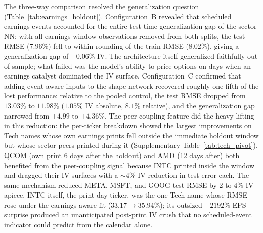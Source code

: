 \begin{table}[ht]
\centering
\caption{Temporal-holdout sector-NN comparison across the three configurations. The pooled control (A) reproduced the existing four-day reference number ($13.03\%$ test RMSE on the same train/test split). Excluding earnings-window observations from both train and test (B) reduced the test RMSE to $7.96\%$ and collapsed the generalization gap from $+4.99$ to $-0.06\%$ IV. Adding the earnings indicator and peer-coupling feature to the input vector (C) on the original train and test rows reduced the pooled test RMSE to $11.98\%$ and the generalization gap to $+4.36\%$.}\label{tab:earnings_holdout}
\end{table}

The three-way comparison resolved the generalization question (Table~\ref{tab:earnings_holdout}). Configuration~B revealed that scheduled earnings events accounted for the entire test-time generalization gap of the sector NN: with all earnings-window observations removed from both splits, the test RMSE ($7.96\%$) fell to within rounding of the train RMSE ($8.02\%$), giving a generalization gap of $-0.06\%$ IV. The architecture itself generalized faithfully out of sample; what failed was the model's ability to price options on days when an earnings catalyst dominated the IV surface. Configuration~C confirmed that adding event-aware inputs to the shape network recovered roughly one-fifth of the lost performance: relative to the pooled control, the test RMSE dropped from $13.03\%$ to $11.98\%$ ($1.05\%$ IV absolute, $8.1\%$ relative), and the generalization gap narrowed from $+4.99$ to $+4.36\%$. The peer-coupling feature did the heavy lifting in this reduction: the per-ticker breakdown showed the largest improvements on Tech names whose own earnings prints fell outside the immediate holdout window but whose sector peers printed during it (Supplementary Table~\ref{tab:tech_pivot}). QCOM (own print 6 days after the holdout) and AMD (12 days after) both benefited from the peer-coupling signal because INTC printed inside the window and dragged their IV surfaces with a $\sim 4\%$ IV reduction in test error each. The same mechanism reduced META, MSFT, and GOOG test RMSE by 2 to $4\%$ IV apiece. INTC itself, the print-day ticker, was the one Tech name whose RMSE rose under the earnings-aware fit ($33.17 \to 35.94\%$); its outsized $+2192\%$ EPS surprise produced an unanticipated post-print IV crush that no scheduled-event indicator could predict from the calendar alone.

